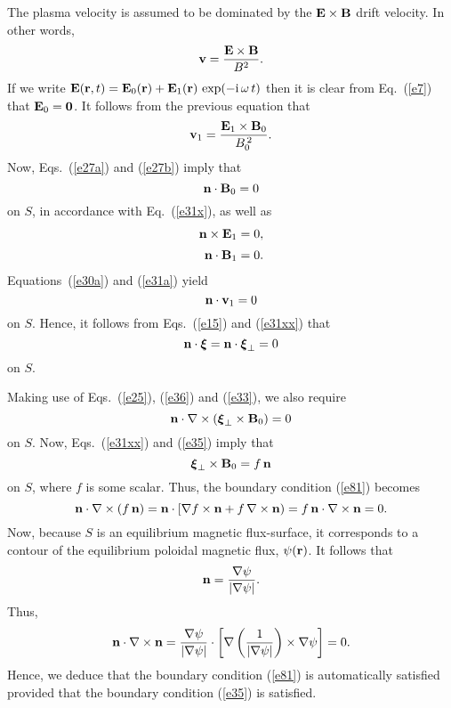 \documentclass[12pt,prb,aps,notitlepage]{revtex4-1}
\newcommand{\bxi}{\mbox{\boldmath$\xi$}}
\begin{document}
The plasma velocity is assumed to be dominated by the ${\bf E}\times {\bf B}$ drift velocity. In other words,
\begin{equation}
{\bf v} = \frac{{\bf E}\times {\bf B}}{B^2}.
\end{equation}
If we write ${\bf E}({\bf r},t)= {\bf E}_0({\bf r})+ {\bf E}_1({\bf r})\,\exp(-{\rm i}\,\omega\,t)$
then it is clear from Eq.~(\ref{e7}) that ${\bf E}_0={\bf 0}$. It follows from the previous equation that
\begin{equation}\label{e30a}
{\bf v}_1 = \frac{{\bf E}_1\times {\bf B}_0}{B_0^{\,2}}.
\end{equation}
Now, Eqs.~(\ref{e27a}) and (\ref{e27b}) imply that
\begin{equation}\label{e31xx}
{\bf n} \cdot {\bf B}_0=0
\end{equation}
on $S$, 
in accordance with Eq.~(\ref{e31x}), 
as well as 
\begin{align}
{\bf n}\times {\bf E}_1&= 0,\label{e31a}\\[0.5ex]
{\bf n} \cdot {\bf B}_1&=0.\label{e33}
\end{align}
Equations~(\ref{e30a}) and (\ref{e31a}) yield
\begin{equation}
{\bf n}\cdot{\bf v}_1=0
\end{equation}
on $S$. Hence, it follows from Eqs.~(\ref{e15}) and (\ref{e31xx}) that
\begin{equation}\label{e35}
{\bf n}\cdot\bxi = {\bf n}\cdot\bxi_\perp = 0
\end{equation}
on $S$. 

 Making use of Eqs.~(\ref{e25}), (\ref{e36}) and (\ref{e33}),
we also require 
\begin{equation}\label{e81}
{\bf n}\cdot\nabla\times(\bxi_\perp\times {\bf B}_0) = 0
\end{equation}
on $S$. Now, Eqs.~(\ref{e31xx}) and (\ref{e35})  imply that
\begin{equation}
\bxi_\perp\times {\bf B}_0= f\,{\bf n}
\end{equation}
on $S$, where $f$ is some scalar.
Thus, the boundary condition (\ref{e81}) becomes
\begin{equation}
{\bf n}\cdot \nabla\times (f\,{\bf n}) = {\bf n}\cdot[\nabla f\times {\bf n} + f\,\nabla\times {\bf n})= f\,{\bf n}\cdot\nabla\times {\bf n} = 0.
\end{equation}
Now, because $S$ is an equilibrium magnetic flux-surface, it corresponds to a contour of the equilibrium poloidal
magnetic flux,  $\psi({\bf r})$. 
It follows that
\begin{equation}
{\bf n} = \frac{\nabla\psi}{|\nabla\psi|}.
\end{equation}
Thus,
\begin{equation}
{\bf n}\cdot\nabla\times {\bf n} = \frac{\nabla\psi}{|\nabla\psi|}\cdot \left[\nabla\left(\frac{1}{|\nabla\psi|}\right)\times \nabla\psi\right]=0.
\end{equation}
Hence, we deduce that the boundary condition (\ref{e81}) is automatically satisfied provided that the boundary condition (\ref{e35}) is satisfied. 
\end{document}
